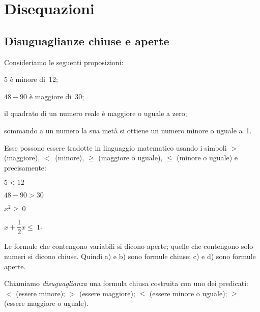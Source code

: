 


\chapter{Disequazioni}

\section{Disuguaglianze chiuse e aperte}
\label{sec:dis_disguagianze}

Consideriamo le seguenti proposizioni:

\begin{enumeratea}
\item 5 è minore di~12;
\item \(48-90\) è maggiore di~30;
\item il quadrato di un numero reale è maggiore o uguale a zero;
\item sommando a un numero la sua metà si ottiene un numero minore
o uguale a~1.
\end{enumeratea}

Esse possono essere tradotte in linguaggio matematico usando i simboli
\(>\) (maggiore), \(<\)~(minore), \({\geq}\) (maggiore o uguale), \({\leq}\) 
(minore o uguale) e precisamente:

\begin{htmulticols}{4}
 \begin{enumeratea}
\item \(5<12\)
\item \(48-90>30\)
\item \(x^{2}\ge~0\)
\item \(x+\dfrac{1}{2}x\le~1\).
 \end{enumeratea}
\end{htmulticols}

Le formule che contengono variabili si dicono aperte; quelle che
contengono solo numeri si dicono chiuse. Quindi a) e b) sono formule
chiuse; c) e d) sono formule aperte.

\begin{definizione}{}{}
Chiamiamo \emph{disuguaglianza} una formula chiusa
costruita con uno dei predicati:~\(<\) (essere minore);
\(>\) (essere maggiore); \({\leq}\) (essere minore o uguale);
\({\geq}\) (essere maggiore o uguale).
\end{definizione}

